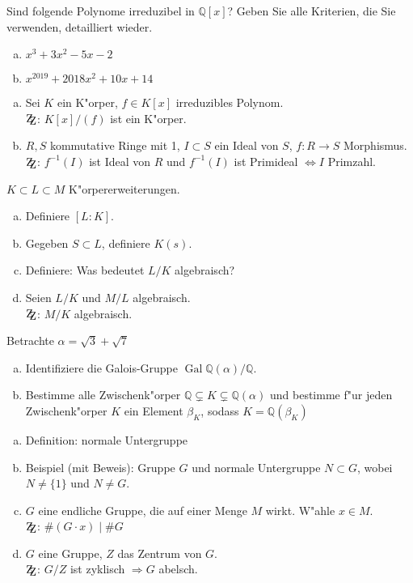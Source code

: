 \documentclass[a4paper,ngerman,12pt,addpoints]{exam}
\newcommand{\setQ}{\mathbb{Q}}
\DeclareMathOperator{\Gal}{Gal}
\begin{document}
		\begin{questions}
		\question[12]
			Sind folgende Polynome irreduzibel in $\setQ[x]$? Geben Sie alle Kriterien, die Sie verwenden, detailliert wieder.
			\begin{enumerate}[a)]
				\item $x^3+3x^2-5x-2$
				\item $x^{2019}+2018x^2+10x+14$
			\end{enumerate}
		\question[12]
			\begin{enumerate}[a)]
				\item Sei $K$ ein K"orper, $f \in K[x]$ irreduzibles Polynom.\\ $\mathrm{Z\kern-.3em\raise-0.5ex\hbox{Z}}$: $K[x]/(f)$ ist ein K"orper.
				\item $R, S$ kommutative Ringe mit 1, $I \subset S$ ein Ideal von $S$, $f: R \longrightarrow S$ Morphismus.\\
				$\mathrm{Z\kern-.3em\raise-0.5ex\hbox{Z}}$: $f^{-1}(I)$ ist Ideal von $R$ und $f^{-1}(I)$ ist Primideal $\Leftrightarrow I$ Primzahl.
			\end{enumerate}
		\question[12]
			$K \subset L \subset M$ K"orpererweiterungen.
			\begin{enumerate}[a)]
				\item Definiere $[L:K]$.
				\item Gegeben $S \subset L$, definiere $K(s)$.
				\item Definiere: Was bedeutet $L/K$ algebraisch?
				\item Seien $L/K$ und $M/L$ algebraisch.\\ $\mathrm{Z\kern-.3em\raise-0.5ex\hbox{Z}}$: $M/K$ algebraisch.
			\end{enumerate}
		\question[12]
			Betrachte $\alpha = \sqrt{3}+\sqrt{7}$
			\begin{enumerate}[a)]
				\item Identifiziere die Galois-Gruppe $\Gal{\setQ(\alpha)/\setQ}$.
				\item Bestimme alle Zwischenk"orper $\setQ \subsetneq K \subsetneq \setQ(\alpha)$ und bestimme f"ur jeden Zwischenk"orper $K$ ein Element $\beta_K$, sodass $K=\setQ(\beta_K)$
			\end{enumerate}
		\question[12]
			\begin{enumerate}[a)]
				\item Definition: normale Untergruppe
				\item Beispiel (mit Beweis): Gruppe $G$ und normale Untergruppe $N \subset G$, wobei $N \neq \{1\}$ und $N \neq G$.
				\item $G$ eine endliche Gruppe, die auf einer Menge $M$ wirkt. W"ahle $x \in M$. \\
				$\mathrm{Z\kern-.3em\raise-0.5ex\hbox{Z}}$: $\#(G \cdot x) \mid \#G$
				\item $G$ eine Gruppe, $Z$ das Zentrum von $G$.\\
				$\mathrm{Z\kern-.3em\raise-0.5ex\hbox{Z}}$: $G/Z$ ist zyklisch $\Rightarrow G$ abelsch.
			\end{enumerate}
	\end{questions}
	\begin{center}
		\gradetable[h][questions]
	\end{center}
\end{document}
